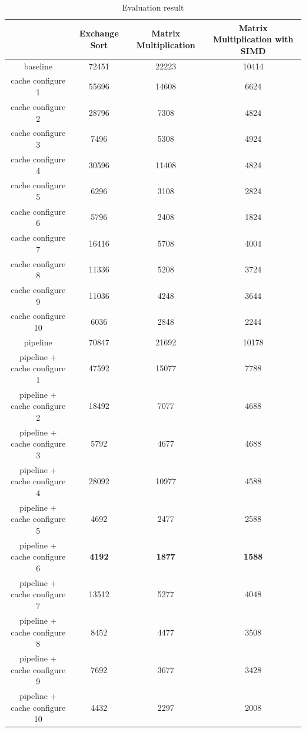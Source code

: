 \documentclass{sig-alternate}
\begin{document}
\begin{table}[!ht]
\caption{Evaluation result}
\label{tab:res}
\centering
\begin{tabular}{|c|c|c|c|}
\hline
 & Exchange Sort & Matrix Multiplication & Matrix Multiplication with SIMD \\
 \hline
baseline & 72451 & 22223 & 10414 \\
\hline
cache configure 1& 55696 & 14608& 6624 \\
\hline
cache configure 2 & 28796 & 7308 & 4824\\
\hline
cache configure 3 & 7496& 5308& 4924\\
\hline
cache configure 4 & 30596& 11408& 4824\\
\hline
cache configure 5& 6296& 3108 & 2824 \\
\hline
cache configure 6 & 5796 & 2408 & 1824 \\
\hline
cache configure 7 & 16416 & 5708 & 4004\\
\hline
cache configure 8 & 11336 & 5208 & 3724\\
\hline
cache configure 9 & 11036 & 4248 & 3644 \\
\hline
cache configure 10 & 6036 & 2848 & 2244 \\
\hline
pipeline &70847 & 21692&10178 \\
\hline
pipeline + cache configure 1 & 47592 & 15077 & 7788\\
\hline 
pipeline + cache configure 2 & 18492 & 7077 & 4688\\
\hline
pipeline + cache configure 3 & 5792 & 4677 & 4688\\
\hline
pipeline + cache configure 4 & 28092 & 10977 & 4588\\
\hline
pipeline + cache configure 5 & 4692 & 2477 & 2588\\
\hline 
pipeline + cache configure 6 & \textbf{4192}& \textbf{1877} & \textbf{1588}\\
\hline
pipeline + cache configure 7 & 13512& 5277& 4048\\
\hline
pipeline + cache configure 8 & 8452& 4477& 3508\\
\hline
pipeline + cache configure 9 & 7692& 3677& 3428\\
\hline
pipeline + cache configure 10 & 4432& 2297& 2008\\
\hline
\end{tabular}
\end{table}
\end{document}
